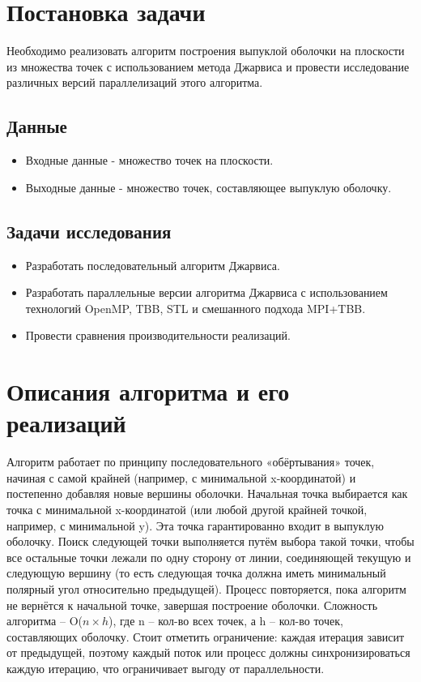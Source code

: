 \documentclass[12pt,a4paper]{extarticle}
\begin{document}
\newpage
\section{Постановка задачи}
Необходимо реализовать алгоритм построения выпуклой оболочки на плоскости из множества точек с использованием метода Джарвиса и провести исследование различных версий параллелизаций этого алгоритма.

\subsection{Данные}
\begin{itemize}
    \item Входные данные - множество точек на плоскости.
    \item Выходные данные - множество точек, составляющее выпуклую оболочку.
\end{itemize}

\subsection{Задачи исследования}
\begin{itemize}
    \item Разработать последовательный алгоритм Джарвиса.
    \item Разработать параллельные версии алгоритма Джарвиса с использованием технологий OpenMP, TBB, STL и смешанного подхода MPI+TBB.
    \item Провести сравнения производительности реализаций.
\end{itemize}

\newpage
\section{Описания алгоритма и его реализаций}
Алгоритм работает по принципу последовательного «обёртывания» точек, начиная с самой крайней (например, с минимальной x-координатой) и постепенно добавляя новые вершины оболочки.
Начальная точка выбирается как точка с минимальной x-координатой (или любой другой крайней точкой, например, с минимальной y). Эта точка гарантированно входит в выпуклую оболочку.
Поиск следующей точки выполняется путём выбора такой точки, чтобы все остальные точки лежали по одну сторону от линии, соединяющей текущую и следующую вершину (то есть следующая точка должна иметь минимальный полярный угол относительно предыдущей).
Процесс повторяется, пока алгоритм не вернётся к начальной точке, завершая построение оболочки.
Сложность алгоритма -- O($n\times h$), где n -- кол-во всех точек, а h -- кол-во точек, составляющих оболочку.
Стоит отметить ограничение: каждая итерация зависит от предыдущей, поэтому каждый поток или процесс должны синхронизироваться каждую итерацию, что ограничивает выгоду от параллельности.
\end{document}
